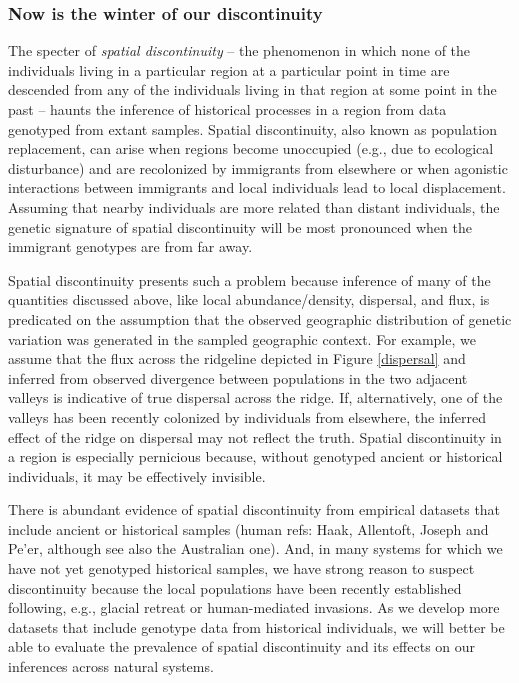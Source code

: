 \documentclass{ar-1col}
\newcommand{\plr}[1]{{\color{green}{#1}}}
\begin{document}
%       

\subsubsection{Now is the winter of our discontinuity}

The specter of \textit{spatial discontinuity} --
the phenomenon in which none of the individuals 
living in a particular region at a particular point in time 
are descended from any of the individuals living in that region 
at some point in the past
-- haunts the inference of historical processes in a region 
from data genotyped from extant samples.
Spatial discontinuity, 
also known as population replacement, 
can arise when regions become unoccupied
(e.g., due to ecological disturbance) 
and are recolonized by immigrants from elsewhere or 
when agonistic interactions between immigrants and local individuals 
lead to local displacement. 
Assuming that nearby individuals are more related than distant individuals, 
the genetic signature of spatial discontinuity will be most pronounced 
when the immigrant genotypes are from far away.

Spatial discontinuity presents such a problem because 
inference of many of the quantities discussed above, 
like local abundance/density, dispersal, and flux, 
is predicated on the assumption that 
the observed geographic distribution of genetic variation 
was generated in the sampled geographic context.
For example, 
we assume that the flux across the ridgeline 
depicted in Figure \ref{dispersal}
and inferred from observed divergence 
between populations in the two adjacent valleys 
is indicative of true dispersal across the ridge.
If, alternatively, one of the valleys 
has been recently colonized by individuals from elsewhere, 
the inferred effect of the ridge on dispersal may not reflect the truth.
Spatial discontinuity in a region is especially pernicious because, 
without genotyped ancient or historical individuals, 
it may be effectively invisible.

There is abundant evidence of spatial discontinuity 
from empirical datasets that include ancient or historical samples 
(human refs: Haak, Allentoft, Joseph and Pe'er, 
although see also the Australian one).
And, in many systems for which we have not yet genotyped historical samples, 
we have strong reason to suspect discontinuity 
because the local populations have been recently established 
following, e.g., glacial retreat or human-mediated invasions.
As we develop more datasets that include genotype data from historical individuals, 
we will better be able to evaluate the prevalence of spatial discontinuity 
and its effects on our inferences across natural systems. 
\end{document}
